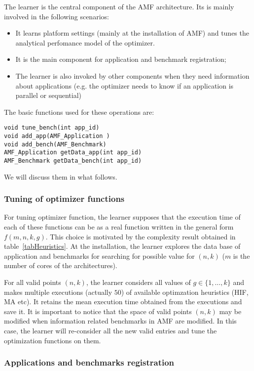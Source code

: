 The learner is the central component of the AMF architecture. Its is mainly involved in the following scenarios:
\begin{itemize}
\item It learns platform settings (mainly at the installation of AMF) and tunes the analytical perfomance model of 
the optimizer. 
\item It is the main component for application and benchmark registration;
\item The learner is also invoked by other components when they need information about applications (e.g. the 
optimizer needs to know if an application is parallel or sequential)
\end{itemize}
The basic functions used for these operations are:
\begin{verbatim}
void tune_bench(int app_id)
void add_app(AMF_Application )
void add_bench(AMF_Benchmark)
AMF_Application getData_app(int app_id)
AMF_Benchmark getData_bench(int app_id)
\end{verbatim}
We will discuss  them in what follows.
\subsubsection{Tuning of optimizer functions}
For tuning optimizer function, the learner supposes that the execution time of each of these 
functions can be as a real function written in the general form $f(m,n,k,g)$. This choice is motivated by the 
complexity result obtained in table~\ref{tabHeuristics}. At the installation, the learner explores  
the data base of application and benchmarks for searching for possible value for $(n,k)$ ($m$ is the 
number of cores of the architectures). 

For all valid points $(n,k)$, the learner considers all values of $g \in \{1,\dots,k\}$ and makes 
multiple executions (actually $50$) of available optimzation heuristics (HIF, MA etc). It retains 
the mean execution time obtained from the executions and save it.
It is important to notice that the space of valid points $(n,k)$ may be modified when information related 
 benchmarks in AMF are modified. In this case, the learner will re-consider all the new valid entries and 
tune the optimization functions on them.

\subsubsection{Applications and benchmarks registration}


